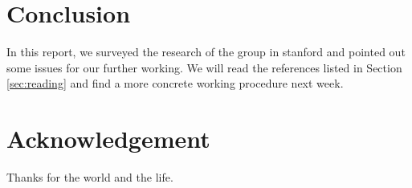 \documentclass{IEEEtran}
\begin{document}
\section{Conclusion}

In this report, we surveyed the research of the group in stanford and pointed out some issues for our further working. We will read the references listed in Section \ref{sec:reading} and find a more concrete working procedure next week.

\section*{Acknowledgement}

Thanks for the world and the life.




\end{document}
